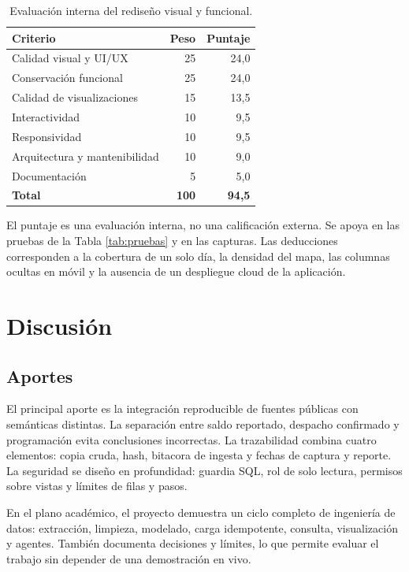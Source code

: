 \documentclass[12pt,a4paper]{article}
\begin{document}
\begin{table}[H]
\centering
\small
\caption{Evaluación interna del rediseño visual y funcional.}
\label{tab:score}
\begin{tabular}{@{}lrr@{}}
\toprule
\textbf{Criterio} & \textbf{Peso} & \textbf{Puntaje} \\
\midrule
Calidad visual y UI/UX & 25 & 24,0 \\
Conservación funcional & 25 & 24,0 \\
Calidad de visualizaciones & 15 & 13,5 \\
Interactividad & 10 & 9,5 \\
Responsividad & 10 & 9,5 \\
Arquitectura y mantenibilidad & 10 & 9,0 \\
Documentación & 5 & 5,0 \\
\midrule
\textbf{Total} & \textbf{100} & \textbf{94,5} \\
\bottomrule
\end{tabular}
\end{table}

El puntaje es una evaluación interna, no una calificación externa. Se apoya en las pruebas de la Tabla \ref{tab:pruebas} y en las capturas. Las deducciones corresponden a la cobertura de un solo día, la densidad del mapa, las columnas ocultas en móvil y la ausencia de un despliegue cloud de la aplicación.

\section{Discusión}\label{sec:discusion}

\subsection{Aportes}

El principal aporte es la integración reproducible de fuentes públicas con semánticas distintas. La separación entre saldo reportado, despacho confirmado y programación evita conclusiones incorrectas. La trazabilidad combina cuatro elementos: copia cruda, hash, bitacora de ingesta y fechas de captura y reporte. La seguridad se diseño en profundidad: guardia SQL, rol de solo lectura, permisos sobre vistas y límites de filas y pasos.

En el plano académico, el proyecto demuestra un ciclo completo de ingeniería de datos: extracción, limpieza, modelado, carga idempotente, consulta, visualización y agentes. También documenta decisiones y límites, lo que permite evaluar el trabajo sin depender de una demostración en vivo.
\end{document}
